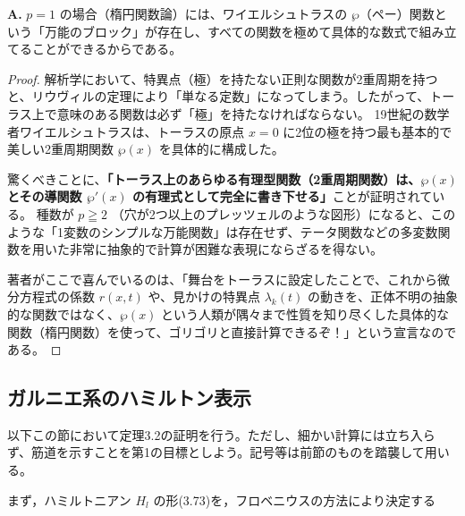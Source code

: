 \begin{Q}[【大局観】著者は「種数 $p \geqq 2$ の場合と異なり、$p=1$（トーラス）のときはすべての量を具体的に書き下すことができる」と強調しているが、なぜ $p=1$ はそんなに特別なのか？]
\textbf{A.} $p=1$ の場合（楕円関数論）には、ワイエルシュトラスの $\wp$（ペー）関数という「万能のブロック」が存在し、すべての関数を極めて具体的な数式で組み立てることができるからである。

\begin{proof}
解析学において、特異点（極）を持たない正則な関数が2重周期を持つと、リウヴィルの定理により「単なる定数」になってしまう。したがって、トーラス上で意味のある関数は必ず「極」を持たなければならない。
19世紀の数学者ワイエルシュトラスは、トーラスの原点 $x=0$ に2位の極を持つ最も基本的で美しい2重周期関数 $\wp(x)$ を具体的に構成した。

驚くべきことに、\textbf{「トーラス上のあらゆる有理型関数（2重周期関数）は、$\wp(x)$ とその導関数 $\wp'(x)$ の有理式として完全に書き下せる」}ことが証明されている。
種数が $p \geqq 2$ （穴が2つ以上のプレッツェルのような図形）になると、このような「1変数のシンプルな万能関数」は存在せず、テータ関数などの多変数関数を用いた非常に抽象的で計算が困難な表現にならざるを得ない。

著者がここで喜んでいるのは、「舞台をトーラスに設定したことで、これから微分方程式の係数 $r(x,t)$ や、見かけの特異点 $\lambda_k(t)$ の動きを、正体不明の抽象的な関数ではなく、$\wp(x)$ という人類が隅々まで性質を知り尽くした具体的な関数（楕円関数）を使って、ゴリゴリと直接計算できるぞ！」という宣言なのである。
\end{proof}
\end{Q}

\subsection{ガルニエ系のハミルトン表示}

\begin{story}

以下この節において定理3.2の証明を行う。ただし、細かい計算には立ち入らず、筋道を示すことを第1の目標としよう。記号等は前節のものを踏襲して用いる。

まず，ハミルトニアン $H_l$ の形(3.73)を，フロベニウスの方法により決定する
\end{story}

